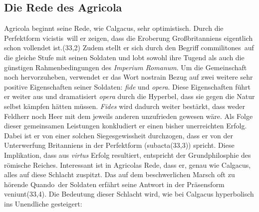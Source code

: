 \documentclass[12pt]{article}
\begin{document}
	\subsection{Die Rede des Agricola}
	\label{agricola}
	Agricola beginnt seine Rede, wie Calgacus, sehr optimistisch. Durch die Perfektform \glqq vicistis\grqq\ will er zeigen, dass die Eroberung Großbritanniens eigentlich schon vollendet ist.(33,2) Zudem stellt er sich durch den Begriff \glqq commilitones\grqq\ auf die gleiche Stufe mit seinen Soldaten und lobt sowohl ihre Tugend als auch die günstigen Rahmenbedingungen des \textit{Imperium Romanum}. Um die Gemeinschaft noch hervorzuheben, verwendet er das Wort \glqq nostra\grqq in Bezug auf zwei weitere sehr positive Eigenschaften seiner Soldaten: \textit{fide} und \textit{opera}. Diese Eigenschaften führt er weiter aus und dramatisiert \textit{opera} durch die Hyperbel, dass sie gegen die Natur selbst kämpfen hätten müssen. \textit{Fides} wird dadurch weiter bestärkt, dass weder Feldherr noch Heer mit dem jeweils anderen unzufrieden gewesen wäre. Als Folge dieser gemeinsamen Leistungen konkludiert er einen bisher unerreichten Erfolg. Dabei ist er von einer solchen Siegesgewissheit durchzogen, dass er von der Unterwerfung Britanniens in der Perfektform (\glqq subacta\grqq(33,3)) spricht. Diese Implikation, dass aus \textit{virtus} Erfolg resultiert, entspricht der Grundphilosphie des römische Reiches.
	Interessant ist in Agricolas Rede, dass er, genau wie Calgacus, alles auf diese Schlacht zuspitzt. Das auf dem beschwerlichen Marsch oft zu hörende \glqq Quando\grqq\ der Soldaten erfährt seine Antwort in der Präsensform \glqq veniunt\grqq(33,4). Die Bedeutung dieser Schlacht wird, wie bei Calgacus hyperbolisch ins Unendliche gesteigert:
\end{document}
